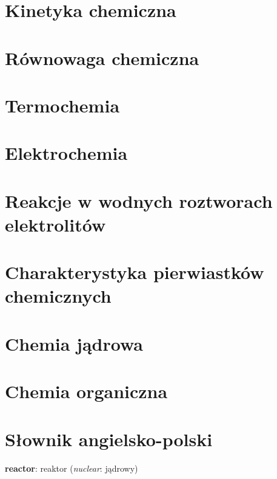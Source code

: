 \documentclass{createspace}
\begin{document}
\chapter{Kinetyka chemiczna}


\chapter{Równowaga chemiczna}


\chapter{Termochemia}


\chapter{Elektrochemia}


\chapter{Reakcje w wodnych roztworach elektrolitów}

\chapter{Charakterystyka pierwiastków chemicznych}






\chapter{Chemia jądrowa}


\chapter{Chemia organiczna}

\appendix
\chapter{Słownik angielsko-polski}
\begin{compactitem}
\item \textbf{reactor}: reaktor (\emph{nuclear}: jądrowy)
\end{compactitem}

\raggedright



\printindex

\printindex[persons]
\end{document}
